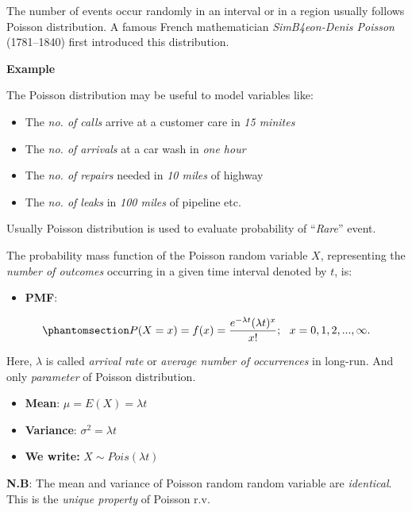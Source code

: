 \documentclass[
  11pt,
  letterpaper,
  DIV=11,
  numbers=noendperiod]{scrreprt}
\providecommand{\tightlist}{%
  \setlength{\itemsep}{0pt}\setlength{\parskip}{0pt}}
\begin{document}
The number of events occur randomly in an interval or in a region
usually follows Poisson distribution. A famous French mathematician
\emph{SimB4eon-Denis Poisson} (1781--1840) first introduced this
distribution.

\textbf{Example}

The Poisson distribution may be useful to model variables like:

\begin{itemize}
\tightlist
\item
  The \emph{no. of calls} arrive at a customer care in \emph{15 minites}
\item
  The \emph{no. of arrivals} at a car wash in \emph{one hour}
\item
  The \emph{no. of repairs} needed in \emph{10 miles} of highway
\item
  The \emph{no. of leaks} in \emph{100 miles} of pipeline etc.
\end{itemize}

Usually Poisson distribution is used to evaluate probability of
``\emph{Rare}'' event.

The probability mass function of the Poisson random variable \(X\),
representing the \emph{number of outcomes} occurring in a given time
interval denoted by \(t\), is:

\begin{itemize}
\tightlist
\item
  \textbf{PMF}:
\end{itemize}

\begin{equation}\phantomsection\label{eq-poisson}{P(X=x)=f(x)=\frac{e^{-\lambda t}(\lambda t)^x}{x!}; \ \ x=0,1,2,...,\infty.}\end{equation}

Here, \(\lambda\) is called \emph{arrival rate} or \emph{average number
of occurrences} in long-run. And only \emph{parameter} of Poisson
distribution.

\begin{itemize}
\item
  \textbf{Mean}: \(\mu=E(X)=\lambda t\)
\item
  \textbf{Variance}: \(\sigma^2 =\lambda t\)
\item
  \textbf{We write:} \(X\sim Pois(\lambda t)\)
\end{itemize}

\textbf{N.B}: The mean and variance of Poisson random random variable
are \emph{identical}. This is the \emph{unique property} of Poisson r.v.
\end{document}
